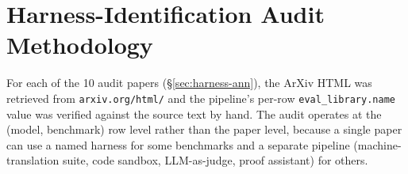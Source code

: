 \documentclass[11pt]{article}
\begin{document}
\begin{table}[ht]
\centering
\setlength{\tabcolsep}{4pt}
\caption{Per-paper entries, precision (extracted scores that match the paper),
and recall (reported scores that were captured) for the score-extraction audit
(\S\ref{sec:score-ann}).}
\label{tab:score-ann-app}
\end{table}


\section{Harness-Identification Audit Methodology}
\label{app:harness}

For each of the 10 audit papers (\S\ref{sec:harness-ann}), the ArXiv HTML
was retrieved from \texttt{arxiv.org/html/} and the pipeline's per-row
\texttt{eval\_library.name} value was verified against the source text by
hand. The audit operates at the (model, benchmark) row level rather than
the paper level, because a single paper can use a named harness for some
benchmarks and a separate pipeline (machine-translation suite, code
sandbox, LLM-as-judge, proof assistant) for others.
\end{document}
